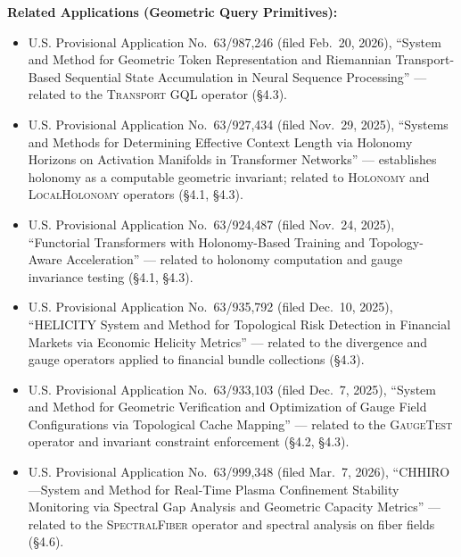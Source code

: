 \documentclass[11pt,letterpaper]{article}
\begin{document}
\textbf{Related Applications (Geometric Query Primitives):}
\begin{itemize}[nosep]
  \item U.S. Provisional Application No.~63/987,246 (filed Feb.~20, 2026), ``System and Method for Geometric Token Representation and Riemannian Transport-Based Sequential State Accumulation in Neural Sequence Processing'' --- related to the \textsc{Transport} GQL operator (\S4.3).
  \item U.S. Provisional Application No.~63/927,434 (filed Nov.~29, 2025), ``Systems and Methods for Determining Effective Context Length via Holonomy Horizons on Activation Manifolds in Transformer Networks'' --- establishes holonomy as a computable geometric invariant; related to \textsc{Holonomy} and \textsc{LocalHolonomy} operators (\S4.1, \S4.3).
  \item U.S. Provisional Application No.~63/924,487 (filed Nov.~24, 2025), ``Functorial Transformers with Holonomy-Based Training and Topology-Aware Acceleration'' --- related to holonomy computation and gauge invariance testing (\S4.1, \S4.3).
  \item U.S. Provisional Application No.~63/935,792 (filed Dec.~10, 2025), ``HELICITY System and Method for Topological Risk Detection in Financial Markets via Economic Helicity Metrics'' --- related to the divergence and gauge operators applied to financial bundle collections (\S4.3).
  \item U.S. Provisional Application No.~63/933,103 (filed Dec.~7, 2025), ``System and Method for Geometric Verification and Optimization of Gauge Field Configurations via Topological Cache Mapping'' --- related to the \textsc{GaugeTest} operator and invariant constraint enforcement (\S4.2, \S4.3).
  \item U.S. Provisional Application No.~63/999,348 (filed Mar.~7, 2026), ``CHHIRO---System and Method for Real-Time Plasma Confinement Stability Monitoring via Spectral Gap Analysis and Geometric Capacity Metrics'' --- related to the \textsc{SpectralFiber} operator and spectral analysis on fiber fields (\S4.6).
\end{itemize}
\end{document}
